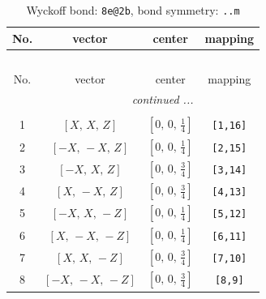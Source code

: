 \documentclass[fleqn,8pt]{jsarticle}
\begin{document}
\begin{longtable}{cccc}
\caption{Wyckoff bond: {\tt 8e@2b}, bond symmetry: {\tt ..m}}
 \\
 \hline \hline
No. & vector & center & mapping \\ \hline \endfirsthead

\multicolumn{3}{l}{\tablename\ \thetable{}} \\
 \hline \hline
No. & vector & center & mapping \\ \hline \endhead

 \hline \hline
\multicolumn{3}{r}{\footnotesize\it continued ...} \\ \endfoot

 \hline \hline
\multicolumn{3}{r}{} \\ \endlastfoot

1 & $\left[ X,\, X,\, Z \right]$ & $\left[ 0,\, 0,\, \frac{1}{4} \right]$ & {\tt [1,16]} \\ \hline
2 & $\left[ - X,\, - X,\, Z \right]$ & $\left[ 0,\, 0,\, \frac{1}{4} \right]$ & {\tt [2,15]} \\ \hline
3 & $\left[ - X,\, X,\, Z \right]$ & $\left[ 0,\, 0,\, \frac{3}{4} \right]$ & {\tt [3,14]} \\ \hline
4 & $\left[ X,\, - X,\, Z \right]$ & $\left[ 0,\, 0,\, \frac{3}{4} \right]$ & {\tt [4,13]} \\ \hline
5 & $\left[ - X,\, X,\, - Z \right]$ & $\left[ 0,\, 0,\, \frac{1}{4} \right]$ & {\tt [5,12]} \\ \hline
6 & $\left[ X,\, - X,\, - Z \right]$ & $\left[ 0,\, 0,\, \frac{1}{4} \right]$ & {\tt [6,11]} \\ \hline
7 & $\left[ X,\, X,\, - Z \right]$ & $\left[ 0,\, 0,\, \frac{3}{4} \right]$ & {\tt [7,10]} \\ \hline
8 & $\left[ - X,\, - X,\, - Z \right]$ & $\left[ 0,\, 0,\, \frac{3}{4} \right]$ & {\tt [8,9]} \\
\end{longtable}
\renewcommand{\arraystretch}{1.2}
\end{document}
